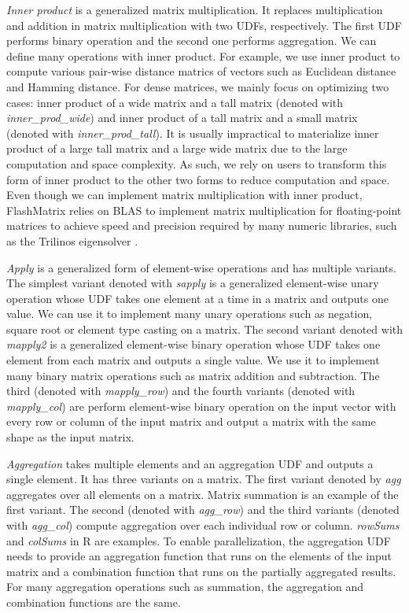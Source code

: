 \textit{Inner product} is a generalized matrix multiplication. It replaces
multiplication and addition in matrix multiplication with two UDFs,
respectively. The first UDF performs binary operation and the second one
performs aggregation. We can define many operations
with inner product. For example, we use inner product to compute various
pair-wise distance matrics of vectors such as Euclidean distance and
Hamming distance. For dense matrices, we mainly focus on
optimizing two cases: inner product of a wide matrix and a tall matrix (denoted
with \textit{inner\_prod\_wide}) and inner product of a tall matrix and a small
matrix (denoted with \textit{inner\_prod\_tall}). It is usually impractical to
materialize inner product of a large tall matrix and a large wide matrix due to
the large computation and space complexity. As such, we rely on users to
transform this form of inner product to the other two forms to reduce computation
and space. Even though we can implement matrix multiplication with inner product,
FlashMatrix relies on BLAS to implement matrix multiplication for
floating-point matrices to achieve speed and precision required by
many numeric libraries, such as the Trilinos eigensolver \cite{anasazi, FlashEigen}.

\textit{Apply} is a generalized form of element-wise operations and has
multiple variants. The simplest variant denoted with \textit{sapply} is
a generalized element-wise unary operation whose UDF takes one element at a time
in a matrix and outputs one value. We can use it to implement many unary
operations such as negation, square root or element type casting
on a matrix. The second variant denoted with \textit{mapply2} is a generalized
element-wise binary operation whose UDF takes one element from each
matrix and outputs a single value. We use it to implement many binary
matrix operations such as matrix addition and subtraction. The third
(denoted with \textit{mapply\_row}) and the fourth variants (denoted with
\textit{mapply\_col}) are perform element-wise
binary operation on the input vector with every row or column of the input
matrix and output a matrix with the same shape as the input matrix.

\textit{Aggregation} takes multiple elements and an aggregation UDF and outputs
a single element. It has three variants on a matrix.
The first variant denoted by \textit{agg} aggregates over all elements on a matrix.
Matrix summation is an example of the first variant. The second (denoted with
\textit{agg\_row}) and the third variants (denoted with \textit{agg\_col})
compute aggregation over each individual row or column. \textit{rowSums}
and \textit{colSums} in R are examples.
To enable parallelization, the aggregation UDF needs to
provide an aggregation function that runs on the elements of the input matrix
and a combination function that runs on the partially aggregated
results. For many aggregation operations such as summation, the aggregation
and combination functions are the same.

